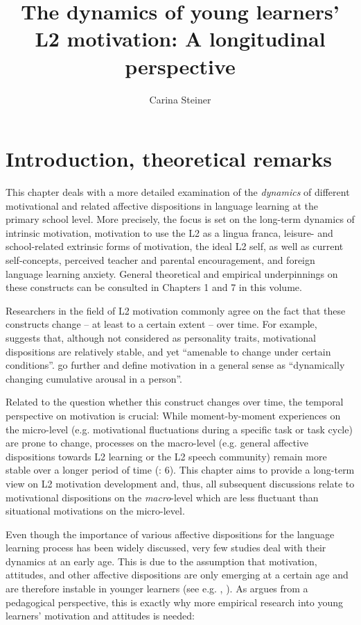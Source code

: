 \documentclass[output=paper]{langsci/langscibook}
\author{Carina Steiner\orcid{}\affiliation{University of Bern, Center for the Study of Language and Society}}
\title{The dynamics of young learners’ L2 motivation: A longitudinal perspective}
\begin{document}
\maketitle 

\section{Introduction, theoretical remarks}

This chapter deals with a more detailed examination of the \textit{dynamics} of different motivational and related affective dispositions in language learning at the primary school level. More precisely, the focus is set on the long-term dynamics of intrinsic motivation, motivation to use the L2 as a lingua franca, leisure- and school-related extrinsic forms of motivation, the ideal L2 self, as well as current self-concepts, perceived teacher and parental encouragement, and foreign language learning anxiety. General theoretical and empirical underpinnings on these constructs can be consulted in Chapters 1 and 7 in this volume.

Researchers in the field of L2 motivation commonly agree on the fact that these constructs change – at least to a certain extent – over time. For example, \citet[11]{Gardner2007} suggests that, although not considered as personality traits, motivational dispositions are relatively stable, and yet “amenable to change under certain conditions”. \citet[65]{DoernyeiOtto1998} go further and define motivation in a general sense as “dynamically changing cumulative arousal in a person”. 

Related to the question whether this construct changes over time, the temporal perspective on motivation is crucial: While moment-by-moment experiences on the micro-level (e.g. motivational fluctuations during a specific task or task cycle) are prone to change, processes on the macro-level (e.g. general affective dispositions towards L2 learning or the L2 speech community) remain more stable over a longer period of time (\citealt{DoernyeiUshioda2011}: 6). This chapter aims to provide a long-term view on L2 motivation development and, thus, all subsequent discussions relate to motivational dispositions on the \textit{macro}{}-level which are less fluctuant than situational motivations on the micro-level. 

Even though the importance of various affective dispositions for the language learning process has been widely discussed, very few studies deal with their dynamics at an early age. This is due to the assumption that motivation, attitudes, and other affective dispositions are only emerging at a certain age and are therefore instable in younger learners (see e.g. \citealt{Gardner2006}, \citealt{Doernyei2009}). As \citet{Heinzmann2013} argues from a pedagogical perspective, this is exactly why more empirical research into young learners’ motivation and attitudes is needed:
\end{document}
